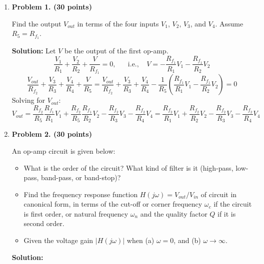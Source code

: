 \begin{enumerate}


\item {\bf Problem 1. (30 points)} 

  Find the output $V_{out}$ in terms of the four inputs $V_1$,
  $V_2$, $V_3$, and $V_4$. Assume $R_5=R_{f_1}$.


  {\bf Solution:} Let $V$ be the output of the first op-amp.
  \[
  \frac{V_1}{R_1}+\frac{V_2}{R_2}+\frac{V}{R_{f_1}}=0,
  \;\;\;\;\;\;\mbox{i.e.,}\;\;\;\;
  V=-\frac{R_{f_1}}{R_1}V_1-\frac{R_{f_1}}{R_2}V_2
  \]
  \[
  \frac{V_{out}}{R_{f_2}}+\frac{V_3}{R_3}+\frac{V_4}{R_4}+\frac{V}{R_5}
  =\frac{V_{out}}{R_{f_2}}+\frac{V_3}{R_3}+\frac{V_4}{R_4}
  -\frac{1}{R_5}\left(\frac{R_{f_1}}{R_1}V_1-\frac{R_{f_1}}{R_2}V_2\right)=0
  \]
  Solving for $V_{out}$:
  \[
  V_{out}=\frac{R_{f_2}}{R_5}\frac{R_{f_1}}{R_1}V_1+\frac{R_{f_2}}{R_5}\frac{R_{f_1}}{R_2}V_2-\frac{R_{f_2}}{R_3}V_3-\frac{R_{f_2}}{R_4}V_4
  =\frac{R_{f_2}}{R_1}V_1+\frac{R_{f_2}}{R_2}V_2-\frac{R_{f_2}}{R_3}V_3-\frac{R_{f_2}}{R_4}V_4
  \]

\item {\bf Problem 2. (30 points)} 

  An op-amp circuit is given below:


  \begin{itemize}
  \item What is the order of the circuit? What kind of filter is it
    (high-pass, low-pass, band-pass, or band-stop)? 
  \item Find the frequency response function $H(j\omega)=V_{out}/V_{in}$ 
    of circuit in canonical form, in terms of the cut-off or corner 
    frequency $\omega_c$ if the circuit is first order, or natural 
    frequency $\omega_n$ and the quality factor $Q$ if it is second
    order.
  \item Given the voltage gain $|H(j\omega)|$ when (a) $\omega=0$, 
    and (b) $\omega\rightarrow\infty$.
  \end{itemize}

{\bf Solution:}


\end{enumerate}
